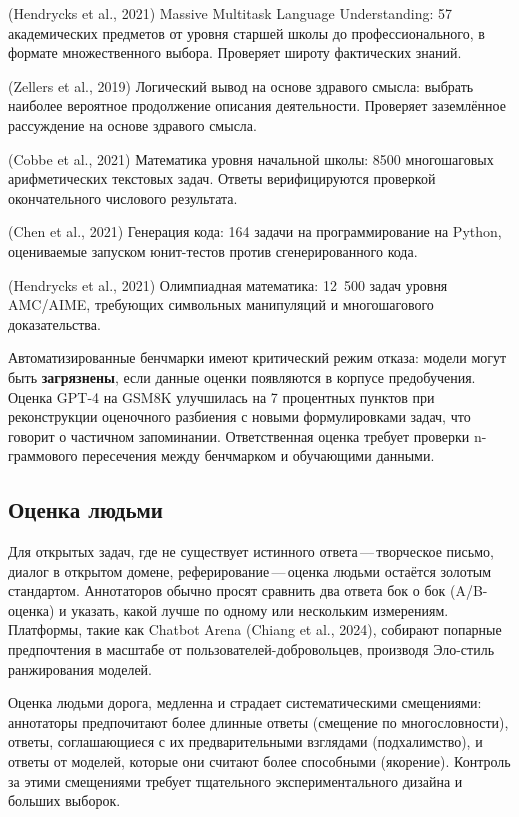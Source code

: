 \begin{description}[leftmargin=!, labelwidth=3.5cm]
  \item[MMLU] (Hendrycks et al., 2021) Massive Multitask Language Understanding: 57 академических предметов от уровня старшей школы до профессионального, в формате множественного выбора. Проверяет широту фактических знаний.
  \item[HellaSwag] (Zellers et al., 2019) Логический вывод на основе здравого смысла: выбрать наиболее вероятное продолжение описания деятельности. Проверяет заземлённое рассуждение на основе здравого смысла.
  \item[GSM8K] (Cobbe et al., 2021) Математика уровня начальной школы: 8500 многошаговых арифметических текстовых задач. Ответы верифицируются проверкой окончательного числового результата.
  \item[HumanEval] (Chen et al., 2021) Генерация кода: 164 задачи на программирование на Python, оцениваемые запуском юнит-тестов против сгенерированного кода.
  \item[MATH] (Hendrycks et al., 2021) Олимпиадная математика: 12~500 задач уровня AMC/AIME, требующих символьных манипуляций и многошагового доказательства.
\end{description}

Автоматизированные бенчмарки имеют критический режим отказа: модели могут быть \textbf{загрязнены}, если данные оценки появляются в корпусе предобучения. Оценка GPT-4 на GSM8K улучшилась на 7 процентных пунктов при реконструкции оценочного разбиения с новыми формулировками задач, что говорит о частичном запоминании. Ответственная оценка требует проверки n-граммового пересечения между бенчмарком и обучающими данными.

\subsection{Оценка людьми}

Для открытых задач, где не существует истинного ответа\,---\,творческое письмо, диалог в открытом домене, реферирование\,---\,оценка людьми остаётся золотым стандартом. Аннотаторов обычно просят сравнить два ответа бок о бок (A/B-оценка) и указать, какой лучше по одному или нескольким измерениям. Платформы, такие как Chatbot Arena (Chiang et al., 2024), собирают попарные предпочтения в масштабе от пользователей-добровольцев, производя Эло-стиль ранжирования моделей.

Оценка людьми дорога, медленна и страдает систематическими смещениями: аннотаторы предпочитают более длинные ответы (смещение по многословности), ответы, соглашающиеся с их предварительными взглядами (подхалимство), и ответы от моделей, которые они считают более способными (якорение). Контроль за этими смещениями требует тщательного экспериментального дизайна и больших выборок.


